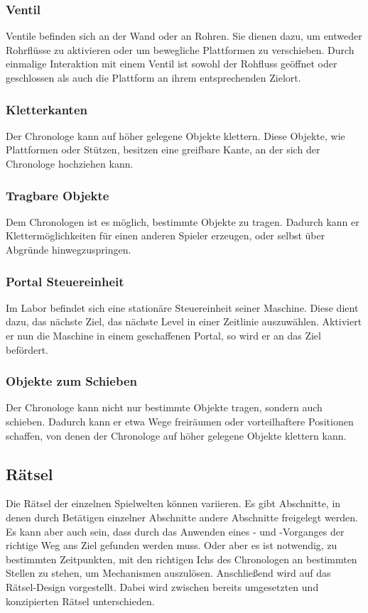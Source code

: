 \subsubsection{Ventil}\label{sec:ventil}
Ventile befinden sich an der Wand oder an Rohren. Sie dienen dazu, um entweder Rohrflüsse zu aktivieren oder um bewegliche Plattformen zu verschieben. Durch einmalige Interaktion mit einem Ventil ist sowohl der Rohfluss geöffnet oder geschlossen als auch die Plattform an ihrem entsprechenden Zielort.

\subsubsection{Kletterkanten}
Der Chronologe kann auf höher gelegene Objekte klettern. Diese Objekte, wie  Plattformen oder Stützen, besitzen eine greifbare Kante, an der sich der Chronologe hochziehen kann. 

\subsubsection{Tragbare Objekte}
Dem Chronologen ist es möglich, bestimmte Objekte zu tragen. Dadurch kann er Klettermöglichkeiten für einen anderen Spieler erzeugen, oder selbst über Abgründe hinwegzuspringen.

\subsubsection{Portal Steuereinheit}
Im Labor befindet sich eine stationäre Steuereinheit seiner Maschine. Diese dient dazu, das nächste Ziel, das nächste Level in einer Zeitlinie auszuwählen. Aktiviert er nun die Maschine in einem geschaffenen Portal, so wird er an das Ziel befördert.

\subsubsection{Objekte zum Schieben}
Der Chronologe kann nicht nur bestimmte Objekte tragen, sondern auch schieben. Dadurch kann er etwa Wege freiräumen oder vorteilhaftere Positionen schaffen, von denen der Chronologe auf höher gelegene Objekte klettern kann.

\subsection{Rätsel}
Die Rätsel der einzelnen Spielwelten können variieren. Es gibt Abschnitte, in denen durch Betätigen einzelner Abschnitte andere Abschnitte freigelegt werden. Es kann aber auch sein, dass durch das Anwenden eines - und -Vorganges der richtige Weg ans Ziel gefunden werden muss. Oder aber es ist notwendig, zu bestimmten Zeitpunkten, mit den richtigen Ichs des Chronologen an bestimmten Stellen zu stehen, um Mechanismen auszulösen. Anschließend wird auf das Rätsel-Design vorgestellt. Dabei wird zwischen bereits umgesetzten und konzipierten Rätsel unterschieden.

